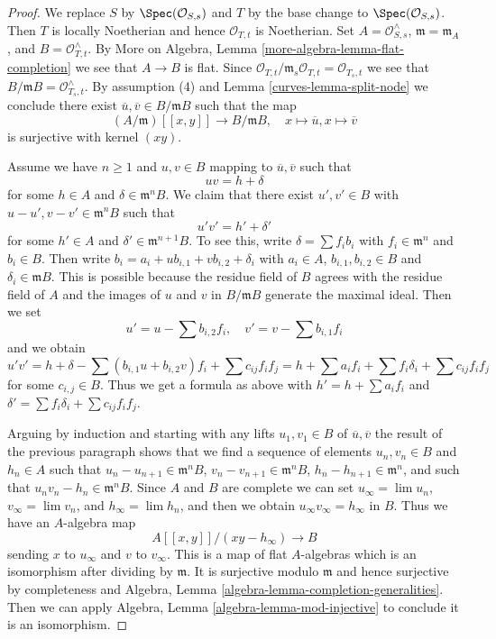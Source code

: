 \begin{proof}

We replace $S$ by $\Spec(\mathcal{O}_{S, s})$ and $T$ by the base change
to $\Spec(\mathcal{O}_{S, s})$. Then $T$ is locally Noetherian and hence
$\mathcal{O}_{T, t}$ is Noetherian.
Set $A = \mathcal{O}_{S, s}^\wedge$, $\mathfrak m = \mathfrak m_A$, and
$B = \mathcal{O}_{T, t}^\wedge$. By
More on Algebra, Lemma \ref{more-algebra-lemma-flat-completion}
we see that $A \to B$ is flat. Since
$\mathcal{O}_{T, t}/\mathfrak m_s \mathcal{O}_{T, t} = \mathcal{O}_{T_s, t}$
we see that $B/\mathfrak m B = \mathcal{O}_{T_s, t}^\wedge$.
By assumption (4) and Lemma \ref{curves-lemma-split-node}
we conclude there exist $\overline{u}, \overline{v} \in B/\mathfrak m B$
such that the map
$$
(A/\mathfrak m)[[x, y]] \longrightarrow B/\mathfrak m B,\quad
x \longmapsto \overline{u},
x \longmapsto \overline{v}
$$
is surjective with kernel $(xy)$.

\medskip\noindent
Assume we have $n \geq 1$ and $u, v \in B$ mapping to
$\overline{u}, \overline{v}$ such that
$$
u v = h + \delta
$$
for some $h \in A$ and $\delta \in \mathfrak m^nB$.
We claim that there exist $u', v' \in B$ with
$u - u', v - v' \in \mathfrak m^n B$ such that
$$
u' v' = h' + \delta'
$$
for some $h' \in A$ and $\delta' \in \mathfrak m^{n + 1}B$.
To see this, write $\delta = \sum f_i b_i$ with
$f_i \in \mathfrak m^n$ and $b_i \in B$. Then write
$b_i = a_i + u b_{i, 1} + v b_{i, 2} + \delta_i$ with
$a_i \in A$, $b_{i, 1}, b_{i, 2} \in B$ and $\delta_i \in \mathfrak m B$.
This is possible because the residue field of $B$ agrees with the
residue field of $A$ and the images of $u$ and $v$ in $B/\mathfrak m B$
generate the maximal ideal. Then we set
$$
u' = u - \sum b_{i, 2}f_i,\quad
v' = v - \sum b_{i, 1}f_i
$$
and we obtain
$$
u'v' = h + \delta - \sum (b_{i, 1}u + b_{i, 2}v)f_i + \sum
c_{ij}f_if_j =
h + \sum a_if_i + \sum f_i \delta_i + \sum c_{ij}f_if_j
$$
for some $c_{i, j} \in B$.
Thus we get a formula as above with $h' = h + \sum a_if_i$
and $\delta' = \sum f_i \delta_i + \sum c_{ij}f_if_j$.

\medskip\noindent
Arguing by induction and starting with any lifts $u_1, v_1 \in B$
of $\overline{u}, \overline{v}$ the result of the previous paragraph
shows that we find a sequence of elements
$u_n, v_n \in B$ and $h_n \in A$ such that
$u_n - u_{n + 1} \in \mathfrak m^n B$,
$v_n - v_{n + 1} \in \mathfrak m^n B$,
$h_n - h_{n + 1} \in \mathfrak m^n$,
and such that $u_n v_n - h_n \in \mathfrak m^n B$.
Since $A$ and $B$ are complete we can set
$u_\infty = \lim u_n$, $v_\infty = \lim v_n$,  and
$h_\infty = \lim h_n$, and then we obtain $u_\infty v_\infty = h_\infty$
in $B$. Thus we have an $A$-algebra map
$$
A[[x, y]]/(xy - h_\infty) \longrightarrow B
$$
sending $x$ to $u_\infty$ and $v$ to $v_\infty$.
This is a map of flat $A$-algebras which is an
isomorphism after dividing by $\mathfrak m$.
It is surjective modulo $\mathfrak m$ and hence surjective
by completeness and
Algebra, Lemma \ref{algebra-lemma-completion-generalities}.
Then we can apply Algebra, Lemma \ref{algebra-lemma-mod-injective}
to conclude it is an isomorphism.
\end{proof}

